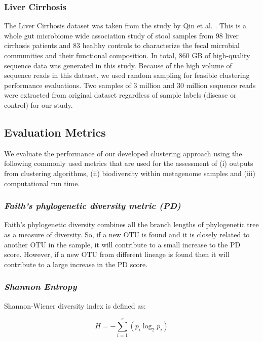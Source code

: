 \documentclass[10pt, conference, compsocconf]{IEEEtran}
\begin{document}
\subsubsection{Liver Cirrhosis}
The Liver Cirrhosis dataset was taken from the study by Qin et al. \cite{qin2014alterations}. This is 
a whole gut microbiome wide association study of stool samples from 98 liver cirrhosis patients and 83 
healthy controls to characterize the fecal microbial communities and their functional composition. In total, 
860 GB of high-quality sequence data was 
generated in this study. Because of the high volume of sequence reads in this dataset, we used random sampling for 
feasible clustering performance evaluations. Two samples of 3 million and 30 million sequence reads were extracted 
from original dataset regardless of sample labels 
(disease or control) for our study.  


\subsection{\textbf{Evaluation Metrics}}

We evaluate the performance of our developed clustering approach using 
the following commonly used metrics that are used 
for the assessment of (i) outputs from clustering algorithms, (ii) biodiversity
within metagenome samples and (iii) computational run time. 


\subsubsection{\textit{Faith’s phylogenetic diversity metric (PD)}}
Faith’s phylogenetic diversity \cite{MARfaith1992conservation} combines all 
the branch lengths of phylogenetic tree as a measure of diversity. So, if a new 
OTU is found and it is closely related to another OTU in the sample, it will contribute to 
a small increase to the PD score. However, if a new OTU from different lineage is found then it will contribute to a large increase in the PD score.

\subsubsection{\textit{Shannon Entropy}}

Shannon-Wiener diversity index is defined as:

\begin{equation}
H={-} \sum_{i=1}^{s} \left( p_i\log_2p_i \right)
\end{equation}
\end{document}
